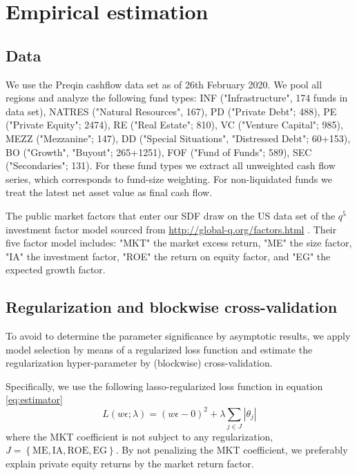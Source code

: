 \documentclass[12pt]{article}
\begin{document}
\section{Empirical estimation}

\subsection{Data}

We use the Preqin cashflow data set as of 26th February 2020.
We pool all regions and analyze the following fund types:
INF ("Infrastructure", 174 funds in data set), 
NATRES ("Natural Resources", 167),
PD ("Private Debt"; 488),
PE ("Private Equity"; 2474),
RE ("Real Estate"; 810),
VC ("Venture Capital"; 985),
MEZZ ("Mezzanine"; 147),
DD ("Special Situations", "Distressed Debt"; 60+153),
BO ("Growth", "Buyout"; 265+1251),
FOF ("Fund of Funds"; 589),
SEC ("Secondaries"; 131).
For these fund types we extract all unweighted cash flow series, which corresponds to fund-size weighting.
For non-liquidated funds we treat the latest net asset value as final cash flow.

The public market factors that enter our SDF draw on the US data set of the $q^5$ investment factor model sourced from \url{http://global-q.org/factors.html} \citep{HXZ15,HXZ20}. 
Their five factor model includes: "MKT" the market excess return, "ME" the size factor, "IA" the investment factor, "ROE" the return on equity factor, and "EG" the expected growth factor.


\subsection{Regularization and blockwise cross-validation}

To avoid to determine the parameter significance by asymptotic results, we apply model selection by means of a regularized loss function and estimate the regularization hyper-parameter by (blockwise) cross-validation.

Specifically, we use the following lasso-regularized loss function in equation \ref{eq:estimator}
\begin{equation}
\label{eq:lasso_loss_function}
L(w\epsilon; \lambda) = (w\epsilon-0)^2 + \lambda \sum_{j \in J} \left| \theta_j \right|
\end{equation}
where the MKT coefficient is not subject to any regularization, $J = \left\{\mathrm{ME}, \mathrm{IA}, \mathrm{ROE}, \mathrm{EG}\right\}$.
By not penalizing the MKT coefficient, we preferably explain private equity returns by the market return factor.
\end{document}

